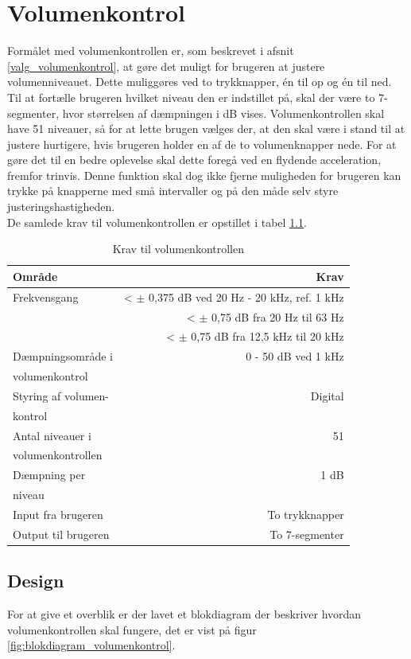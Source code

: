 \chapter{Volumenkontrol}
\label{volumenkontrol}
Formålet med volumenkontrollen er, som beskrevet i afsnit \ref{valg_volumenkontrol}, at gøre det muligt for brugeren at justere volumenniveauet. Dette muliggøres ved to trykknapper, én til op og én til ned. Til at fortælle brugeren hvilket niveau den er indstillet på, skal der være to 7-segmenter, hvor størrelsen af dæmpningen i dB vises. Volumenkontrollen skal have 51 niveauer, så for at lette brugen vælges der, at den skal være i stand til at justere hurtigere, hvis brugeren holder en af de to volumenknapper nede. For at gøre det til en bedre oplevelse skal dette foregå ved en flydende acceleration, fremfor trinvis. Denne funktion skal dog ikke fjerne muligheden for brugeren kan trykke på knapperne med små intervaller og på den måde selv styre justeringshastigheden. \\
De samlede krav til volumenkontrollen er opstillet i tabel \ref{tab:krav_volumenkontrol}.

\begin{table}[h]
\centering
\begin{tabular}{l|r}
\hline\hline
Område & Krav \\
\hline\hline
Frekvensgang & < $\pm$ 0,375 dB ved 20 Hz - 20 kHz, ref. 1 kHz \\
& < $\pm$ 0,75 dB fra 20 Hz til 63 Hz \\
& < $\pm$ 0,75 dB fra 12,5 kHz til 20 kHz \\[4pt]
Dæmpningsområde i & 0 - 50 dB ved 1 kHz \\
volumenkontrol & \\[4pt]
Styring af volumen- & Digital \\
kontrol & \\[4pt]
Antal niveauer i & 51 \\
volumenkontrollen & \\[4pt]
Dæmpning per & 1 dB \\
niveau & \\[4pt]
Input fra brugeren & To trykknapper \\[4pt]
Output til brugeren & To 7-segmenter \\
\hline\hline
\end{tabular}
\caption{Krav til volumenkontrollen}
\label{tab:krav_volumenkontrol}
\end{table}

\clearpage
\section{Design}
\label{volumenkontrol-design}
For at give et overblik er der lavet et blokdiagram der beskriver hvordan volumenkontrollen skal fungere, det er vist på figur \ref{fig:blokdiagram_volumenkontrol}.

